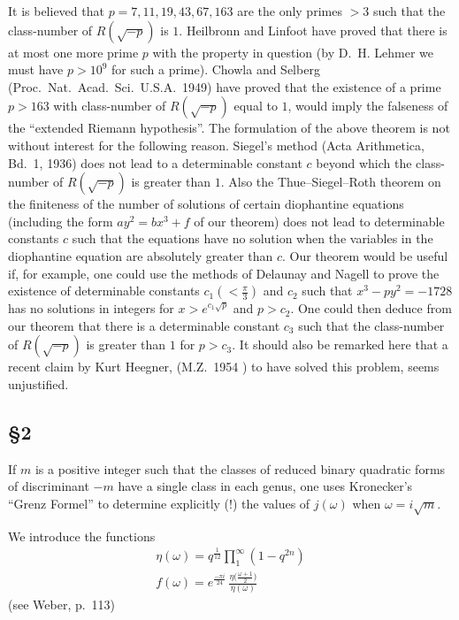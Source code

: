 It is believed that $p=7,11,19,43,67,163$ are the only primes $>3$ such
that the class-number of $R(\sqrt{-p})$ is $1$. Heilbronn and Linfoot
have proved that there is at most one more prime $p$ with the property in
question (by D.~H. Lehmer we must have $p>10^{9}$ for such a prime).
Chowla and Selberg (Proc.\ Nat.\ Acad.\ Sci.\ U.S.A.\ 1949)
\cite{chowlaselberg1949} have proved that the existence of a prime
$p>163$ with class-number of $R(\sqrt{-p})$ equal to $1$, would imply the
falseness of the ``extended Riemann hypothesis''. The formulation of the
above theorem is not without interest for the following reason. Siegel's
method (Acta Arithmetica, Bd.~1, 1936) does not lead to a determinable
constant $c$ beyond which the class-number of $R(\sqrt{-p})$ is greater
than $1$. Also the Thue--Siegel--Roth theorem on the finiteness of the
number of solutions of certain diophantine equations (including the form
$ay^{2}=bx^{3}+f$ of our theorem) does not lead to determinable constants
$c$ such that the equations have no solution when the variables in the
diophantine equation are absolutely greater than $c$. Our theorem would
be useful if, for example, one could use the methods of Delaunay and
Nagell to prove the existence of determinable constants
$c_{1}(<\frac{\pi}{3})$ and $c_{2}$ such that $x^{3}-py^{2}=-1728$ has no
solutions in integers for $x>e^{c_{1}\sqrt{p}}$ and $p>c_{2}$. One could
then deduce from our theorem that there is a determinable constant $c_{3}$
such that the class-number of $R(\sqrt{-p})$ is greater than $1$ for
$p>c_{3}$. It should also be remarked here that a recent claim by Kurt
Heegner, (M.Z.\ 1954 \cite{heegner1954}) to have solved this problem,
seems unjustified.

\subsection*{\texorpdfstring{§2}{§2}}

If $m$ is a positive integer such that the classes of reduced binary
quadratic forms of discriminant $-m$ have a single class in each genus,
one uses Kronecker's ``Grenz Formel'' to determine explicitly (!) the
values of $j(\omega)$ when $\omega=i\sqrt{m}$.

We introduce the functions
\[
\begin{gathered}
\eta(\omega)=q^{\frac{1}{12}}\prod_{1}^{\infty}(1-q^{2n})\\[3pt]
f(\omega)=e^{\frac{-\pi i}{24}}\,\frac{\eta\bigl(\frac{\omega+1}{2}\bigr)}{\eta(\omega)}
\end{gathered}
\]
(see Weber, p.~113)


